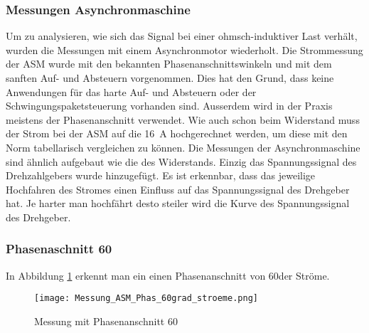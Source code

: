 \newpage
\subsubsection{Messungen Asynchronmaschine}
Um zu analysieren, wie sich das Signal bei einer ohmsch-induktiver Last verhält, wurden die Messungen mit einem Asynchronmotor wiederholt. Die Strommessung der ASM wurde mit den bekannten Phasenanschnittswinkeln und mit dem sanften Auf- und Absteuern vorgenommen. Dies hat den Grund, dass keine Anwendungen für das harte Auf- und Absteuern oder der Schwingungspaketsteuerung vorhanden sind. Ausserdem wird in der Praxis meistens der Phasenanschnitt verwendet. Wie auch schon beim Widerstand muss der Strom bei der ASM auf die \SI{16}{A} hochgerechnet werden, um diese mit den Norm tabellarisch vergleichen zu können. Die Messungen der Asynchronmaschine sind ähnlich aufgebaut wie die des Widerstands. Einzig das Spannungssignal des Drehzahlgebers wurde hinzugefügt. Es ist erkennbar, dass das jeweilige Hochfahren des Stromes einen Einfluss auf das Spannungssignal des Drehgeber hat. Je harter man hochfährt desto steiler wird die Kurve des Spannungssignal des Drehgeber. 


\subsubsection*{Phasenaschnitt 60\textdegree}
In Abbildung \ref{fig:Mess_Phas_60grad_stroeme} erkennt man ein einen Phasenanschnitt von 60\textdegree der Ströme.

\begin{figure}[ht!]
	\centering
	\texttt{[image: Messung\_ASM\_Phas\_60grad\_stroeme.png]}	
	\caption{Messung mit Phasenanschnitt 60\textdegree}\label{fig:Mess_Phas_60grad_stroeme}
\end{figure}

